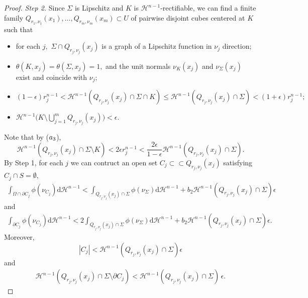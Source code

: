 \documentclass[10pt,a4paper]{amsart}
\newcommand{\bound}{b}
\newcommand{\cH}{\mathcal{H}}
\newcommand{\p}{\partial}
\newcommand{\strictlyincluded}{\subset\subset}
\newcommand{\substrate}{S}
\renewcommand{\d}{\mathrm{d}}
\begin{document}
\begin{proof}
{\it Step 2.} Since $\Sigma$ is Lipschitz and $K$ is $\cH^{n-1}$-rectifiable, we can find a finite  family $Q_{r_1,\nu_1}(x_1),\ldots, Q_{r_m,\nu_m}(x_m) \subset U$ of pairwise disjoint cubes centered at $K$ such that 
\begin{itemize}
 \item[($\rm a_1$)] for each $j,$ $\Sigma\cap Q_{r_j,\nu_j}(x_j)$ is a graph of a Lipschitz function in $\nu_j$ direction;

 \item[($\rm a_2$)] $\theta(K,x_j)=\theta(\Sigma,x_j)=1,$ and the unit normals $\nu_K(x_j)$ and $\nu_{\Sigma}(x_j)$ exist and coincide with $\nu_j;$
 
 \item[($\rm a_3$)] $(1-\epsilon)r_j^{n-1} <\cH^{n-1}(Q_{r_j,\nu_j}(x_j)\cap \Sigma\cap K)\le \cH^{n-1}(Q_{r_j,\nu_j}(x_j)\cap \Sigma)<(1+\epsilon)r_j^{n-1};$
 
 \item[($\rm a_4$)] $\cH^{n-1}\Big(K\setminus \bigcup_{j=1}^m Q_{r_j,\nu_j}(x_j)\Big)<\epsilon.$
\end{itemize}

Note that by ($\rm a_3$),
\begin{equation}\label{K_out_sigma89}
\cH^{n-1}(Q_{r_j,\nu_j}(x_j)\cap \Sigma\setminus K) <2\epsilon r_j^{n-1} < \frac{2\epsilon}{1-\epsilon} \cH^{n-1}(Q_{r_j,\nu_j}(x_j)\cap \Sigma). 
\end{equation}
%
By Step 1, for each $j$ we can contruct an open set $C_j\strictlyincluded Q_{r_j,\nu_j}(x_j)$ satisfying $C_j\cap\substrate =\emptyset,$
\begin{align}\label{est_Cjjjj9099}
\int_{\Omega\cap \p C_j} \phi(\nu_{C_j})\d\cH^{n-1} < \int_{Q_{r_j,\nu_j}(x_j)\cap\Sigma}\phi(\nu_\Sigma)\d\cH^{n-1} + \bound_2\cH^{n-1}(Q_{r_j,\nu_j}(x_j)\cap\Sigma)\epsilon 
\end{align}
and 
\begin{align*} 
\int_{\p C_j} \phi(\nu_{C_j})\d\cH^{n-1} < 2 \int_{Q_{r_j,\nu_j}(x_j)\cap\Sigma}\phi(\nu_\Sigma)\d\cH^{n-1} + \bound_2\cH^{n-1}(Q_{r_j,\nu_j}(x_j)\cap\Sigma)\epsilon.
\end{align*}
Moreover,
\begin{equation}\label{vol_estCjjjj}
|C_j| < \cH^{n-1}(Q_{r_j,\nu_j}(x_j)\cap\Sigma)\epsilon  
\end{equation}
%
and
%
\begin{align}\label{out_jshsh00}
\cH^{n-1}(Q_{r_j,\nu_j}(x_j)\cap\Sigma\setminus \p C_j) < \cH^{n-1}(Q_{r_j,\nu_j}(x_j)\cap\Sigma)\,\epsilon.
\end{align}



\end{proof}
\end{document}
